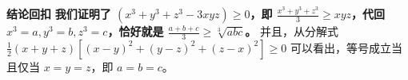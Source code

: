 \begin{proofbox}
\medskip
\textbf{\textcolor{CProof}{结论回扣}}
\textbf{我们证明了 $(x^3+y^3+z^3 - 3xyz) \ge 0$，即 $\frac{x^3+y^3+z^3}{3} \ge xyz$，代回 $x^3=a, y^3=b, z^3=c$，恰好就是 $\frac{a+b+c}{3} \ge \sqrt[3]{abc}$。} 并且，从分解式 $\frac{1}{2}(x+y+z)[(x-y)^2+(y-z)^2+(z-x)^2] \ge 0$ 可以看出，等号成立当且仅当 $x=y=z$，即 $a=b=c$。
\end{proofbox}
